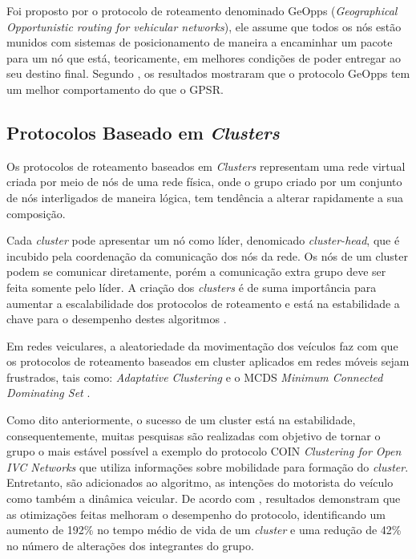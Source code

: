 \documentclass[
	12pt,				%
	oneside,			%
	a4paper,			%
	english,			%
	brazil				%
	]{abntex2ppgsi}
\begin{document}
Foi proposto por   o protocolo de roteamento denominado GeOpps (\textit{Geographical Opportunistic routing for vehicular networks}), ele assume que todos os nós estão munidos com sistemas de posicionamento de maneira a encaminhar um pacote para um nó que está, teoricamente, em melhores condições de poder entregar  ao seu destino final. Segundo  , os resultados mostraram que o protocolo GeOpps tem um melhor comportamento do que o GPSR.

\subsection{Protocolos Baseado em \textit{Clusters} }

Os protocolos de roteamento baseados em \textit{Clusters} representam uma rede virtual criada por meio de nós de uma rede física, onde o grupo criado por um conjunto de nós interligados de maneira lógica, tem tendência a alterar rapidamente a sua composição.

Cada \textit{cluster} pode apresentar um nó como líder, denomicado \textit{cluster-head}, que é incubido pela coordenação da comunicação dos nós da rede. Os nós de um cluster podem se comunicar diretamente, porém a comunicação extra grupo deve ser feita somente pelo líder. A criação dos \textit{clusters} é de suma importância para aumentar a escalabilidade dos protocolos de roteamento e está na estabilidade a chave para o desempenho destes algoritmos \cite{luis2009melhoria}.

Em redes veiculares, a aleatoriedade da movimentação dos veículos faz com que os protocolos de roteamento baseados em cluster aplicados em redes móveis sejam frustrados, tais como: \textit{Adaptative Clustering} e o MCDS \textit{Minimum Connected Dominating Set} \cite{das1997routing}.


Como dito anteriormente, o sucesso de um cluster está na estabilidade, consequentemente, muitas pesquisas são realizadas com objetivo de tornar o grupo o mais estável possível a exemplo do protocolo COIN \textit{Clustering for Open  IVC Networks} que utiliza informações sobre mobilidade para formação do \textit{cluster}. Entretanto, são adicionados ao algoritmo, as intenções do motorista do veículo como também a dinâmica veicular. De acordo com  , resultados demonstram que as otimizações feitas melhoram o desempenho do protocolo, identificando um aumento de 192\% no tempo  médio de vida de um \textit{cluster} e uma redução de 42\% no número de alterações dos integrantes do grupo.
\end{document}
